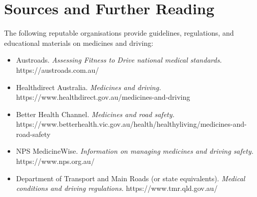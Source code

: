 \section*{Sources and Further Reading}
The following reputable organisations provide guidelines, regulations, and educational materials on medicines and driving:
\begin{itemize}
    \item Austroads. \textit{Assessing Fitness to Drive national medical standards.} https://austroads.com.au/
    \item Healthdirect Australia. \textit{Medicines and driving.} https://www.healthdirect.gov.au/medicines-and-driving
    \item Better Health Channel. \textit{Medicines and road safety.} https://www.betterhealth.vic.gov.au/health/healthyliving/medicines-and-road-safety
    \item NPS MedicineWise. \textit{Information on managing medicines and driving safety.} https://www.nps.org.au/
    \item Department of Transport and Main Roads (or state equivalents). \textit{Medical conditions and driving regulations.} https://www.tmr.qld.gov.au/
\end{itemize}
